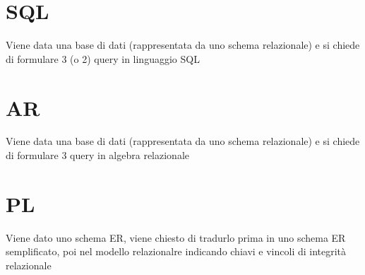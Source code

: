 \documentclass[12pt, a4paper, openany]{book}
\begin{document}
\section{SQL}
Viene data una base di dati (rappresentata da uno schema relazionale) e si chiede di formulare 3 (o 2) query in linguaggio SQL
\section{AR}
Viene data una base di dati (rappresentata da uno schema relazionale)  e si chiede di formulare 3 query in algebra relazionale
\section{PL}
Viene dato uno schema ER, viene chiesto di tradurlo prima in uno schema ER semplificato, poi nel modello relazionalre indicando chiavi e vincoli di integrità relazionale
\end{document}
